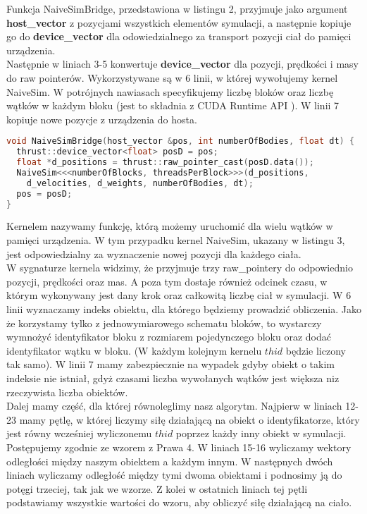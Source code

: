 \documentclass[14pt,twoside,a4paper]{article}
\theoremstyle{definition}
\begin{document}
Funkcja NaiveSimBridge, przedstawiona w listingu 2, przyjmuje jako argument \textbf{host\_vector} z pozycjami wszystkich elementów symulacji, a następnie kopiuje go do \textbf{device\_vector} dla odowiedzialnego za transport pozycji ciał do pamięci urządzenia. \\Następnie w liniach 3-5 konwertuje \textbf{device\_vector} dla pozycji, prędkości i masy do raw pointerów. Wykorzystywane są w 6 linii, w której wywołujemy kernel NaiveSim. W potrójnych nawiasach specyfikujemy liczbę bloków oraz liczbę wątków w każdym bloku (jest to składnia z CUDA Runtime API \cite{runtimeApi}). 
W linii 7 kopiuje nowe pozycje z urządzenia do hosta. 
\bigskip
{}\begin{lstlisting}[language=C++, frame=single, framerule=2pt, caption=Bridge pomiędzy główną pętlą a kernelem]
void NaiveSimBridge(host_vector &pos, int numberOfBodies, float dt) {
  thrust::device_vector<float> posD = pos;
  float *d_positions = thrust::raw_pointer_cast(posD.data());
  NaiveSim<<<numberOfBlocks, threadsPerBlock>>>(d_positions, 
  	d_velocities, d_weights, numberOfBodies, dt);
  pos = posD;
}
\end{lstlisting}
\bigskip
Kernelem nazywamy funkcję, którą możemy uruchomić dla wielu wątków w pamięci urządzenia. W tym przypadku kernel NaiveSim, ukazany w listingu 3, jest odpowiedzialny za wyznaczenie nowej pozycji dla każdego ciała. \\
\bigskip
W sygnaturze kernela widzimy, że przyjmuje trzy raw\_pointery do odpowiednio pozycji, prędkości oraz mas. A poza tym dostaje również  odcinek czasu, w którym wykonywany jest dany krok oraz całkowitą liczbę ciał w symulacji. W 6 linii wyznaczamy indeks obiektu, dla którego będziemy prowadzić obliczenia. Jako że korzystamy tylko z jednowymiarowego schematu bloków, to wystarczy wymnożyć identyfikator bloku z rozmiarem pojedynczego bloku oraz dodać identyfikator wątku w bloku. (W każdym kolejnym kernelu $thid$ będzie liczony tak samo).
W linii 7 mamy zabezpiecznie na wypadek gdyby obiekt o takim indeksie nie istniał, gdyż czasami liczba wywołanych wątków jest większa niz rzeczywista liczba obiektów. \\
\bigskip
Dalej mamy część, dla której równoleglimy nasz algorytm. Najpierw w liniach 12-23 mamy pętlę, w której liczymy siłę działającą na obiekt o identyfikatorze, który jest równy wcześniej wyliczonemu $thid$ poprzez każdy inny obiekt w symulacji. Postępujemy zgodnie ze wzorem z Prawa 4. W liniach 15-16 wyliczamy wektory odległości między naszym obiektem a każdym innym. W następnych dwóch liniach wyliczamy odległość między tymi dwoma obiektami i podnosimy ją do potęgi trzeciej, tak jak we wzorze. Z kolei w ostatnich liniach tej pętli podstawiamy wszystkie wartości do wzoru, aby obliczyć siłę działającą na ciało. \\
\end{document}
